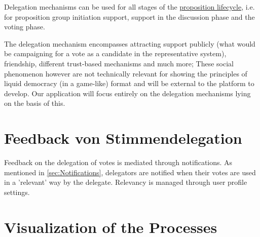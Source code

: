 Delegation mechanisms can be used for all stages of the \href{sec:Model_Propositions}{proposition lifecycle}, i.e. for proposition group initiation support, support in the discussion phase and the voting phase. 

The delegation mechanism encompasses attracting support publicly (what would be campaigning for a vote as a candidate in the representative system), friendship, different trust-based mechanisms and much more; These social phenomenon however are not technically relevant for showing the principles of liquid democracy (in a game-like) format and will be external to the platform to develop. Our application will focus entirely on the delegation mechanisms lying on the basis of this.

\section{Feedback von Stimmendelegation}
% 
% 
% 
\label{sec:Model_VoteFeedback}
Feedback on the delegation of votes is mediated through notifications. 
As mentioned in \ref{sec:Notifications}, delegators are notified when their votes are used in a 'relevant' way by the delegate. Relevancy is managed through user profile settings. 

\section{Visualization of the Processes}
\label{sec:Model_Visualization}